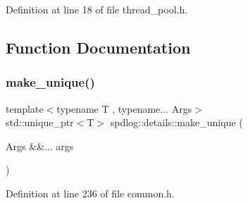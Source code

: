 Definition at line 18 of file thread\+\_\+pool.\+h.



\subsection{Function Documentation}
\mbox{\label{namespacespdlog_1_1details_a2d61216ea1cb33ba27ddc6a78cc98ecd}} 
\subsubsection{\texorpdfstring{make\+\_\+unique()}{make\_unique()}}
{\footnotesize\ttfamily template$<$typename T , typename... Args$>$ \\
std\+::unique\+\_\+ptr$<$T$>$ spdlog\+::details\+::make\+\_\+unique (\begin{DoxyParamCaption}\item[{Args \&\&...}]{args }\end{DoxyParamCaption})}



Definition at line 236 of file common.\+h.

